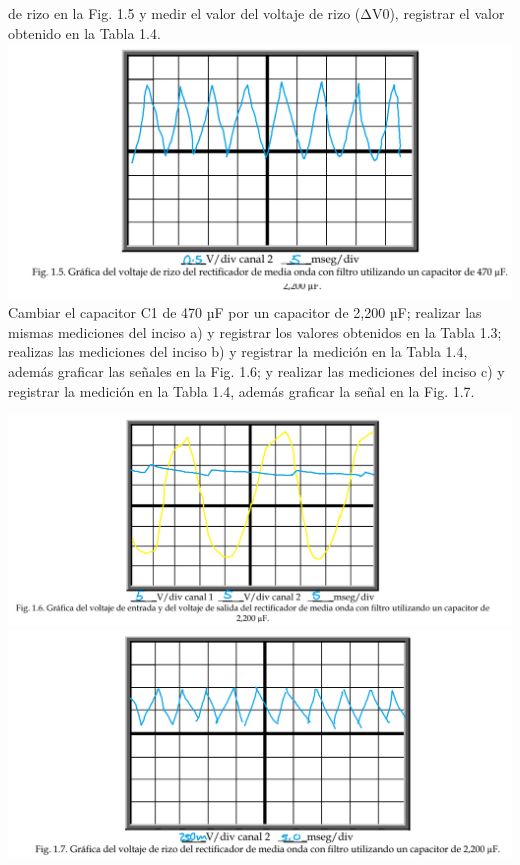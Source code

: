 \documentclass[12pt]{article}
\begin{document}
\begin{enumerate}
\begin{enumerate}
                de rizo en la Fig. 1.5 y medir el valor del voltaje de rizo (ΔV0), registrar el valor obtenido
                en la Tabla 1.4.
                \includegraphics*[scale=0.45]{fig1-5.png}
                Cambiar el capacitor C1 de 470 µF por un capacitor de 2,200 µF; realizar las mismas
                mediciones del inciso a) y registrar los valores obtenidos en la Tabla 1.3; realizas las mediciones del inciso b) y registrar la medición en la Tabla 1.4, además graficar las señales
                en la Fig. 1.6; y realizar las mediciones del inciso c) y registrar la medición en la Tabla 1.4,
                además graficar la señal en la Fig. 1.7.
                \begin{center}
                    \includegraphics*[scale=0.47]{fig1-6.png}
                    \includegraphics*[scale=0.45]{fig1-7.png}

\end{center}
\end{enumerate}
\end{enumerate}
\end{document}
